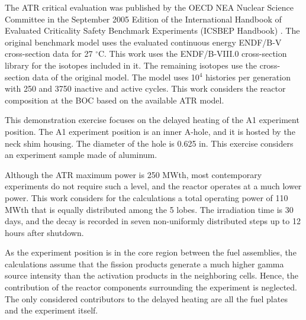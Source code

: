 The ATR critical evaluation was published by the OECD NEA Nuclear Science Committee in the September 2005 Edition of the International Handbook of Evaluated Criticality Safety Benchmark Experiments (ICSBEP Handbook) \cite{ICSBEP}.
The original benchmark model uses the evaluated continuous energy ENDF/B-V cross-section data for 27 $^{\circ}$C.
This work uses the ENDF/B-VIII.0 cross-section library for the isotopes included in it.
The remaining isotopes use the cross-section data of the original model.
The model uses 10$^4$ histories per generation with 250 and 3750 inactive and active cycles.
This work considers the reactor composition at the \gls*{BOC} based on the available ATR model.

This demonstration exercise focuses on the delayed heating of the A1 experiment position.
The A1 experiment position is an inner A-hole, and it is hosted by the neck shim housing.
The diameter of the hole is 0.625 in.
This exercise considers an experiment sample made of aluminum.

Although the ATR maximum power is 250 MWth, most contemporary experiments do not require such a level, and the reactor operates at a much lower power.
This work considers for the calculations a total operating power of 110 MWth that is equally distributed among the 5 lobes.
The irradiation time is 30 days, and the decay is recorded in seven non-uniformly distributed steps up to 12 hours after shutdown.

As the experiment position is in the core region between the fuel assemblies, the calculations assume that the fission products generate a much higher gamma source intensity than the activation products in the neighboring cells.
Hence, the contribution of the reactor components surrounding the experiment is neglected.
The only considered contributors to the delayed heating are all the fuel plates and the experiment itself.



